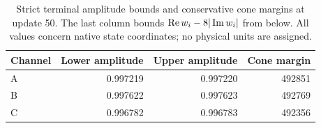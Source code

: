 \begin{table}[htbp]\centering
\caption{Strict terminal amplitude bounds and conservative cone margins at
update 50. The last column bounds $\operatorname{Re} w_i-8|\operatorname{Im} w_i|$ from below.
All values concern native state coordinates; no physical units are assigned.}
\label{tab:terminal}
\begin{tabular}{@{}lrrr@{}}\toprule
Channel & Lower amplitude & Upper amplitude & Cone margin\\\midrule
A & 0.997219 & 0.997220 & 492851 \\
B & 0.997622 & 0.997623 & 492769 \\
C & 0.996782 & 0.996783 & 492356 \\
\bottomrule\end{tabular}
\end{table}
